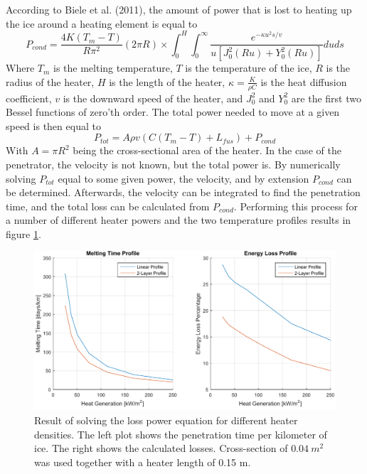 \noindent
According to Biele et al. (2011)\cite{article:biele2011a}, the amount of power that is lost to heating up the ice around a heating element is equal to
\begin{equation}
P_{cond}=\frac{4 K (T_m-T) }{R\pi^2}(2\pi R)\times \int_{0}^{H}\int_{0}^{\infty}\frac{
e^{-\kappa u^2 s/v}
}{
u\left[J_0^2(R u) + Y_0^2(R u)\right]
}duds
\end{equation}
Where $T_m$ is the melting temperature, $T$ is the temperature of the ice, $R$ is the radius of the heater, $H$ is the length of the heater, $\kappa=\frac{K}{\rho C}$ is the heat diffusion coefficient, $v$ is the downward speed of the heater, and $J_0^2$ and $Y_0^2$ are the first two Bessel functions of zero'th order. The total power needed to move at a given speed is then equal to
\begin{equation}
P_{tot} = A\rho v(C(T_m-T) + L_{fus}) + P_{cond}
\end{equation} 
With $A=\pi R^2$ being the cross-sectional area of the heater. In the case of the penetrator, the velocity is not known, but the total power is. By numerically solving $P_{tot}$ equal to some given power, the velocity, and by extension $P_{cond}$ can be determined. Afterwards, the velocity can be integrated to find the penetration time, and the total loss can be calculated from $P_{cond}$. Performing this process for a number of different heater powers and the two temperature profiles results in figure \ref{fig:verificationResult}.

\begin{figure}[ht]
	\centering
	\includegraphics[width=.9\textwidth]{figures/LAMC/verificationResult.pdf}
	\caption{Result of solving the loss power equation for different heater densities. The left plot shows the penetration time per kilometer of ice. The right shows the calculated losses. Cross-section of $\SI{0.04}{m^2}$ was used together with a heater length of 0.15 m.}
	\label{fig:verificationResult}
\end{figure}

